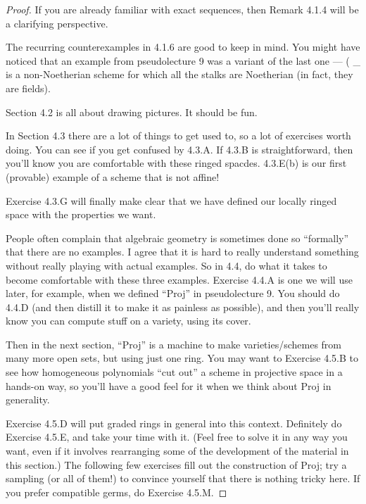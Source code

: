 \documentclass{book}
\theoremstyle{definition}
\begin{document}
\begin{proof}
If you are already familiar with exact sequences, then Remark 4.1.4 will be a clarifying perspective.

The recurring counterexamples in 4.1.6 are good to keep in mind. You might have noticed that an example from pseudolecture 9 was a variant of the last one —  \; (  \otimes_{}  is a non-Noetherian scheme for which all the stalks are Noetherian (in fact, they are fields).

Section 4.2 is all about drawing pictures. It should be fun.

In Section 4.3 there are a lot of things to get used to, so a lot of exercises worth doing. You can see if you get confused by 4.3.A. If 4.3.B is straightforward, then you’ll know you are comfortable with these ringed spacdes. 4.3.E(b) is our first (provable) example of a scheme that is not affine!

Exercise 4.3.G will finally make clear that we have defined our locally ringed space with the properties we want.

People often complain that algebraic geometry is sometimes done so “formally” that there are no examples. I agree that it is hard to really understand something without really playing with actual examples. So in 4.4, do what it takes to become comfortable with these three examples. Exercise 4.4.A is one we will use later, for example, when we defined “Proj” in pseudolecture 9. You should do 4.4.D (and then distill it to make it as painless as possible), and then you’ll really know you can compute stuff on a variety, using its cover.

Then in the next section, “Proj” is a machine to make varieties/schemes from many more open sets, but using just one ring. You may want to Exercise 4.5.B to see how homogeneous polynomials “cut out” a scheme in projective space in a hands-on way, so you’ll have a good feel for it when we think about Proj in generality.

Exercise 4.5.D will put graded rings in general into this context. Definitely do Exercise 4.5.E, and take your time with it. (Feel free to solve it in any way you want, even if it involves rearranging some of the development of the material in this section.) The following few exercises fill out the construction of Proj; try a sampling (or all of them!) to convince yourself that there is nothing tricky here. If you prefer compatible germs, do Exercise 4.5.M.


\end{proof}
\end{document}
